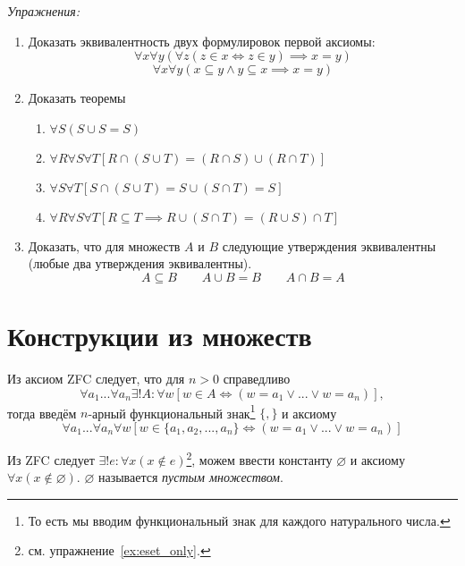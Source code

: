 \newcommand\eset{\varnothing}
\vspace{1em}
{\it Упражнения:}
\begin{enumerate}
	\item{}Доказать эквивалентность двух формулировок первой аксиомы:
		\[
			\forall x\forall y(\forall z(z\in x\iff z\in y)\implies x=y)
		\]
		\[
			\forall x\forall y(x\subseteq y\land y\subseteq x\implies x=y)
		\]

	\item{}Доказать теоремы
		\begin{fullwidth}
			\begin{multicols}{2}
				\begin{enumerate}
					\item{}$\forall S(S\cup S=S)$
					\item{}$\forall R\forall S\forall T[R\cap (S\cup T)=(R\cap S)\cup (R\cap T)]$
					\item{}$\forall S\forall T[S\cap (S\cup T)=S\cup (S\cap T)=S]$
					\item{}$\forall R\forall S\forall T[R\subseteq T
						\implies R\cup (S\cap T)=(R\cup S)\cap T]$
				\end{enumerate}
			\end{multicols}
		\end{fullwidth}

	\item{}Доказать, что для множеств $A$ и $B$ следующие утверждения эквивалентны
		(любые два утверждения эквивалентны).
		\[
			A\subseteq B\qquad A\cup B=B\qquad A\cap B=A
		\]
\end{enumerate}

\section{Конструкции из множеств}

Из аксиом ZFC следует, что для $n>0$ справедливо
\[
	\forall a_1...\forall a_{n}\exists !A:\forall w
	[w\in A\iff (w=a_1\lor...\lor w=a_{n})],
\]
тогда введём $n$-арный функциональный знак\footnote{
	То есть мы вводим функциональный знак для каждого натурального числа.}
$\{,\}$ и аксиому
\[
	\forall a_1...\forall a_{n}\forall w
	[w\in \{a_1,a_2,...,a_{n}\}\iff (w=a_1\lor ...\lor w=a_{n})]
\]

Из ZFC следует ${\exists !e:\forall x(x\notin e)}$\footnote{
	см. упражнение~\ref{ex:eset_only}.},
можем ввести константу $\eset$ и аксиому $\forall x(x\notin \eset)$.
$\eset$ называется {\it пустым множеством}.

